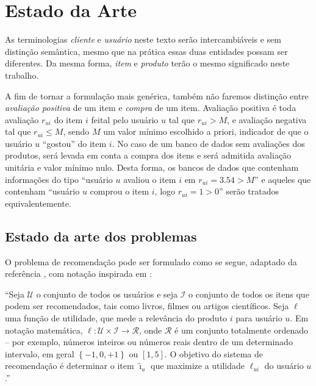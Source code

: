 \chapter[Estado da arte]{Estado da Arte}
\label{chap:estado_da_arte}

As terminologias \textit{cliente} e \textit{usuário} neste texto serão intercambiáveis e sem distinção semântica, mesmo que na prática essas duas entidades possam ser diferentes. Da mesma forma, \textit{item} e \textit{produto} terão o mesmo significado neste trabalho. 

A fim de tornar a formulação mais genérica, também não faremos distinção entre \textit{avaliação positiva} de um item e \textit{compra} de um item. Avaliação positiva é toda avaliação $r_{ui}$ do item $i$ feital pelo usuário $u$ tal que $r_{ui} > M$, e avaliação negativa tal que $r_{ui} \leq M$, sendo $M$ um valor mínimo escolhido a priori, indicador de que o usuário $u$ ``gostou'' do item $i$. No caso de um banco de dados sem avaliações dos produtos, será levada em conta a compra dos itens e será admitida avaliação unitária e valor mínimo nulo. Desta forma, os bancos de dados que contenham informações do tipo ``usuário $u$ avaliou o item $i$ em $r_{ui} = 3.54 > M$'' e aqueles que contenham ``usuário $u$ comprou o item $i$, logo $r_{ui} = 1 > 0$'' serão tratados equivalentemente.


\section{Estado da arte dos problemas} %
\label{sec:estado_da_arte_dos_problemas}

O problema de recomendação pode ser formulado como se segue, adaptado da referência \cite{adomavicius2005toward}, com notação inspirada em \cite{symeonidis2007feature}: 

``Seja $\mathcal{U}$ o conjunto de todos os usuários e seja $\mathcal{I}$ o conjunto de todos os itens que podem ser recomendados, tais como livros, filmes ou artigos científicos. Seja $\ell$ uma função de utilidade, que mede a relevância do produto $i$ para usuário $u$. Em notação matemática, $\ell: \mathcal{U} \times \mathcal{I} \rightarrow \mathcal{R}$, onde $\mathcal{R}$ é um  conjunto totalmente ordenado -- por exemplo, números inteiros ou números reais dentro de um determinado intervalo, em geral $\left\{-1, 0, +1\right\}$ ou $[1, 5]$. O objetivo do sistema de recomendação é determinar o item $\tilde{\imath}_u$ que maximize a utilidade $\ell_{ui}$ do usuário $u$.''

